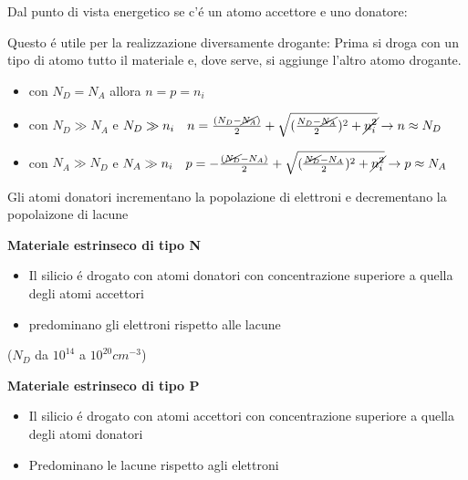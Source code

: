 \documentclass{article}
\begin{document}
Dal punto di vista energetico se c'\'e un atomo accettore e uno donatore:

Questo \'e utile per la realizzazione diversamente drogante:
Prima si droga con un tipo di atomo tutto il materiale e, dove serve, si aggiunge l'altro atomo drogante.

\begin{itemize}
    \item con $N_D = N_A$ allora $ n = p = n_i$
    \item con $N_D \gg N_A$ e $N_D \gg n_i  \quad n = \frac{(N_D - \cancel{N_A})}{2} + \sqrt{(\frac{N_D - \cancel{N_A}}{2})^2 + \cancel{n_i^2}} \rightarrow n \approx N_D$
    \item con $N_A \gg N_D$ e $N_A \gg n_i  \quad p = -\frac{(\cancel{N_D} - N_A)}{2} + \sqrt{(\frac{\cancel{N_D} - N_A}{2})^2 + \cancel{n_i^2}} \rightarrow p \approx N_A$
\end{itemize}

Gli atomi donatori incrementano la popolazione di elettroni e decrementano la popolaizone di lacune

\begin{minipage}[t]{0.5\textwidth}
    \textbf{Materiale estrinseco di tipo N}
    \begin{itemize}
        \item Il silicio \'e drogato con atomi donatori con concentrazione superiore a quella degli atomi accettori
        \item predominano gli elettroni rispetto alle lacune
    \end{itemize}
    ($N_D$ da $10^{14}$ a $10^{20} cm^{-3}$)

    \begin{center}
    \end{center}
\end{minipage}
\begin{minipage}[t]{0.5\textwidth}
    \textbf{Materiale estrinseco di tipo P}
    \begin{itemize}
        \item Il silicio \'e drogato con atomi accettori con concentrazione superiore a quella degli atomi donatori
        \item Predominano le lacune rispetto agli elettroni
    \end{itemize}
    \begin{center}
    \end{center}
\end{minipage}
\end{document}
